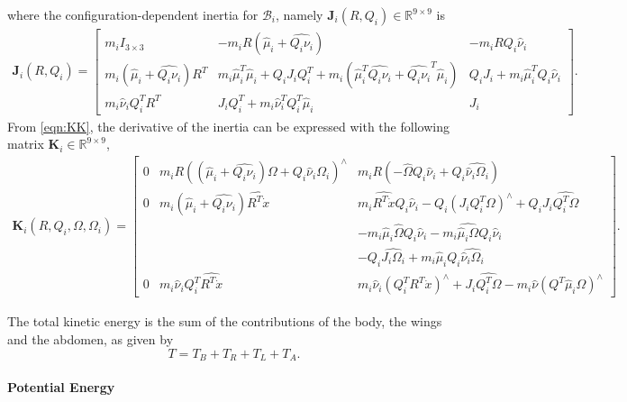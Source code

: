 \documentclass[conf]{new-aiaa}
\renewcommand{\Re}{\ensuremath{\mathbb{R}}}
\begin{document}
where the configuration-dependent inertia for $\mathcal{B}_i$, namely $\mathbf{J}_i(R,Q_i)\in\Re^{9\times 9}$ is
\begin{align}
\mathbf{J}_i(R,Q_i) = 
    \begin{bmatrix}
        m_i I_{3\times 3} & -m_i R(\hat \mu_i + \widehat{Q_i\nu_i}) & - m_i R Q_i \hat \nu_i \\
        m_i (\hat \mu_i + \widehat{Q_i\nu_i}) R^T & m_i \hat\mu_i^T\hat\mu_i + Q_i J_i Q_i^T + m_i (\hat \mu_i^T \widehat{Q_i\nu_i} + \widehat{Q_i\nu_i}^T \hat\mu_i ) & Q_i J_i + m_i \hat\mu_i^T Q_i \hat\nu_i \\
        m_i\hat\nu_i Q_i^T R^T & J_i Q_i^T + m_i \hat\nu_i^T Q_i^T \hat\mu_i & J_i 
    \end{bmatrix}.
\end{align}
From \eqref{eqn:KK}, the derivative of the inertia can be expressed with the following matrix $\mathbf{K}_i\in\Re^{9\times 9}$,
\begin{align}
    \mathbf{K}_i(R,Q_i,\Omega,\Omega_i) = 
    \begin{bmatrix}
        0 & m_i R ((\hat\mu_i+\widehat{Q_i\nu_i})\Omega + Q_i\hat\nu_i\Omega_i)^\wedge 
          & m_i R( -\hat\Omega Q_i \hat\nu_i + Q_i \widehat{\hat \nu_i \Omega_i}) \\
        0 & m_i(\hat\mu_i + \widehat{Q_i\nu_i})\widehat{R^T \dot x}
        & m_i\widehat{R^T\dot x}Q_i\hat\nu_i - Q_i (J_iQ_i^T\Omega)^\wedge + Q_i J_i \widehat{Q_i^T\Omega} \\
        & & - m_i\hat\mu_i\hat\Omega Q_i\hat\nu_i - m_i\widehat{\hat\mu_i\Omega} Q_i \hat\nu_i \\
        & & - Q_i \widehat{J_i\Omega_i} + m_i \hat\mu_i Q_i \widehat{\hat\nu_i \Omega_i} \\
        0 & m_i \hat\nu_i Q_i^T \widehat{R^T\dot x}
        & m_i \hat\nu_i (Q_i^T R^T \dot x)^\wedge + J_i\widehat{Q_i^T\Omega} - m_i\hat\nu (Q^T\hat\mu_i \Omega)^\wedge
    \end{bmatrix}.
\end{align}


The total kinetic energy is the sum of the contributions of the body, the wings and the abdomen, as given by
\begin{equation}
    T = T_B + T_R + T_L + T_A.
\end{equation}

\paragraph{Potential Energy}
\end{document}
